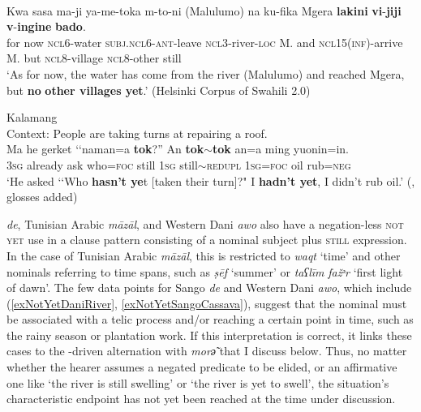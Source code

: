 \begin{exe}
		\ex {}\label{exNotYetContrastive2}\\
		\gll Kwa sasa ma-ji ya-me-toka m-to-ni (Malulumo) na ku-fika Mgera \textbf{lakini} \textbf{vi}-\textbf{jiji} \textbf{v}-\textbf{ingine} \textbf{bado}.\\
		for now \textsc{ncl}6-water \textsc{subj}.\textsc{ncl}6-\textsc{ant}-leave \textsc{ncl3}-river-\textsc{loc} \phantom{(}M. and \textsc{ncl}15(\textsc{inf})-arrive M. but \textsc{ncl}8-village \textsc{ncl}8-other still\\
		\glt \lq As for now, the water has come from the river (Malulumo) and reached Mgera, but \textbf{no} \textbf{other villages yet}.’ (Helsinki Corpus of Swahili 2.0)

\ex\label{exNotYetContrastiveVariation}
	Kalamang\\	
	Context: People are taking turns at repairing a roof.\\
	\gll Ma he gerket \lq\lq{}naman=a \textbf{tok}?” An \textbf{tok$\sim$tok} an=a ming yuonin=in.\\
	3\textsc{sg} already ask \phantom{\lq\lq}who=\textsc{foc} still 1\textsc{sg} still$\sim$\textsc{redupl} 1\textsc{sg}=\textsc{foc} oil rub=\textsc{neg}\\
	\glt \lq He asked \lq\lq Who \textbf{hasn’t ye}t [taken their turn]?" I \textbf{hadn’t yet}, I didn’t rub oil.' (\cite{Visser2021b},  glosses added)
\end{exe}

 \textit{de}, Tunisian Arabic \textit{māzāl}, and Western Dani  \textit{awo} also have a negation-less \textsc{not yet} use in a clause pattern consisting of a nominal subject plus \textsc{still} expression. In the case of Tunisian Arabic \textit{māzāl}, this is restricted to \textit{waqt} \lq time' and other nominals referring to time spans, such as \textit{ṣēf} \lq summer\rq{} or \textit{taʕlīm} \textit{fažᵊr} \lq{}first light of dawn\rq{}. The few data points for Sango \textit{de} and Western Dani \textit{awo}, which include (\ref{exNotYetDaniRiver}, \ref{exNotYetSangoCassava}), suggest that the nominal must be associated with a telic process and/or reaching a certain point in time, such as the rainy season or plantation work. If this interpretation is correct, it links these cases to the -driven alternation with  \textit{morә̃} that I discuss below. Thus, no matter whether the hearer assumes a negated predicate to be elided, or an affirmative one like \lq the river is still swelling\rq{ }or \lq the river is yet to swell\rq{}, the situation's characteristic endpoint has not yet been reached at the time under discussion.


